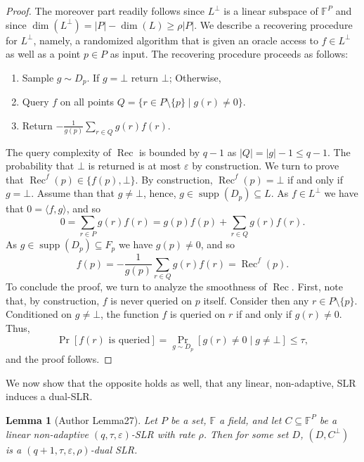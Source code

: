 \documentclass[10pt,a4paper]{article}
\newtheorem{ntlemma}[nttheorem]{Lemma}
\begin{document}
\begin{proof}
The moreover part readily follows since $L^\perp$ is a linear subspace of $\mathbb F^P$ and since $\dim(L^\perp)=|P|-\dim(L)\geq\rho|P|$. We describe a recovering procedure for $L^\perp$, namely, a randomized algorithm that is given an oracle access to $f\in L^\perp$ as well as a point $p\in P$ as input. The recovering procedure proceeds as follows:
\begin{enumerate}
\item Sample $g\sim D_p$. If $g=\bot$ return $\bot$; Otherwise,
\item Query $f$ on all points $Q=\{r\in P\setminus\{p\}\mid g(r)\ne0\}$.
\item Return $-\frac1{g(p)}\sum_{r\in Q}g(r)f(r)$.
\end{enumerate}
The query complexity of $\operatorname{Rec}$ is bounded by $q-1$ as $|Q|=|g|-1\leq q-1$. The probability that $\bot$ is returned is at most $\varepsilon$ by construction. We turn to prove that $\operatorname{Rec}^f(p)\in\{f(p),\bot\}$. By construction, $\operatorname{Rec}^f(p)=\bot$ if and only if $g=\bot$. Assume than that $g\ne\bot$, hence, $g\in\operatorname{supp}(D_p)\subseteq L$. As $f\in L^\perp$ we have that $0=\langle f,g\rangle$, and so
\[0=\sum_{r\in P}g(r)f(r)=g(p)f(p)+\sum_{r\in Q}g(r)f(r).\]
As $g\in\operatorname{supp}(D_p)\subseteq F_p$ we have $g(p)\ne0$, and so
\[f(p)=-\frac1{g(p)}\sum_{r\in Q}g(r)f(r)=\operatorname{Rec}^f(p).\]
To conclude the proof, we turn to analyze the smoothness of $\operatorname{Rec}$. First, note that, by construction, $f$ is never queried on $p$ itself. Consider then any $r\in P\setminus\{p\}$. Conditioned on $g\ne\bot$, the function $f$ is queried on $r$ if and only if $g(r)\ne0$. Thus,
\[\Pr[f(r)\text{ is queried}]=\Pr_{g\sim D_p}[g(r)\ne0\mid g\ne\bot]\leq\tau,\]
and the proof follows.
\end{proof}
We now show that the opposite holds as well, that any linear, non-adaptive, SLR induces a dual-SLR.
\begin{ntlemma}[Author Lemma27]
Let $P$ be a set, $\mathbb F$ a field, and let $C\subseteq\mathbb F^P$ be a linear non-adaptive $(q,\tau,\varepsilon)$-SLR with rate $\rho$. Then for some set $D$, $(D,C^\perp)$ is a $(q+1,\tau,\varepsilon,\rho)$-dual SLR.
\end{ntlemma}
\end{document}
